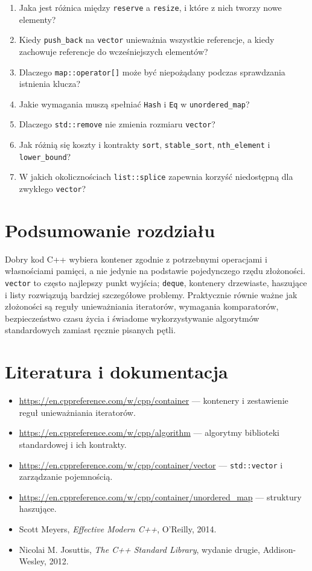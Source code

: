 \begin{enumerate}
\item Jaka jest różnica między \texttt{reserve} a \texttt{resize}, i
  które z nich tworzy nowe elementy?
\item Kiedy \texttt{push\_back} na \texttt{vector} unieważnia wszystkie
  referencje, a kiedy zachowuje referencje do wcześniejszych elementów?
\item Dlaczego \texttt{map::operator[]} może być niepożądany podczas
  sprawdzania istnienia klucza?
\item Jakie wymagania muszą spełniać \texttt{Hash} i \texttt{Eq} w
  \texttt{unordered\_map}?
\item Dlaczego \texttt{std::remove} nie zmienia rozmiaru \texttt{vector}?
\item Jak różnią się koszty i kontrakty \texttt{sort}, \texttt{stable\_sort},
  \texttt{nth\_element} i \texttt{lower\_bound}?
\item W jakich okolicznościach \texttt{list::splice} zapewnia korzyść
  niedostępną dla zwykłego \texttt{vector}?
\end{enumerate}

\section{Podsumowanie rozdziału}

Dobry kod C++ wybiera kontener zgodnie z potrzebnymi operacjami i
własnościami pamięci, a nie jedynie na podstawie pojedynczego rzędu
złożoności. \texttt{vector} to często najlepszy punkt wyjścia;
\texttt{deque}, kontenery drzewiaste, haszujące i listy rozwiązują
bardziej szczegółowe problemy. Praktycznie równie ważne jak złożoności
są reguły unieważniania iteratorów, wymagania komparatorów,
bezpieczeństwo czasu życia i świadome wykorzystywanie algorytmów
standardowych zamiast ręcznie pisanych pętli.

\section*{Literatura i dokumentacja}
\begin{itemize}
\item \url{https://en.cppreference.com/w/cpp/container} --- kontenery i
  zestawienie reguł unieważniania iteratorów.
\item \url{https://en.cppreference.com/w/cpp/algorithm} --- algorytmy
  biblioteki standardowej i ich kontrakty.
\item \url{https://en.cppreference.com/w/cpp/container/vector} ---
  \texttt{std::vector} i zarządzanie pojemnością.
\item \url{https://en.cppreference.com/w/cpp/container/unordered_map} ---
  struktury haszujące.
\item Scott Meyers, \emph{Effective Modern C++}, O'Reilly, 2014.
\item Nicolai M. Josuttis, \emph{The C++ Standard Library}, wydanie drugie,
  Addison-Wesley, 2012.
\end{itemize}

